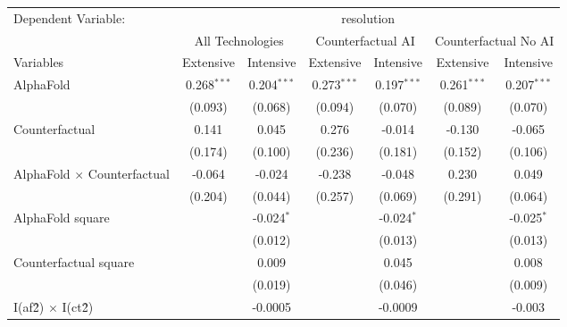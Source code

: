\begingroup
\centering
\begin{tabular}{lcccccc}
   \tabularnewline \midrule \midrule
   Dependent Variable: & \multicolumn{6}{c}{resolution}\\
 & \multicolumn{2}{c}{All Technologies} & \multicolumn{2}{c}{Counterfactual AI} & \multicolumn{2}{c}{Counterfactual No AI} \\
\cmidrule(lr){1-1}\cmidrule(lr){2-3} \cmidrule(lr){4-5} \cmidrule(lr){6-7}
Variables & \multicolumn{1}{c}{Extensive} & \multicolumn{1}{c}{Intensive} & \multicolumn{1}{c}{Extensive} & \multicolumn{1}{c}{Intensive} & \multicolumn{1}{c}{Extensive} & \multicolumn{1}{c}{Intensive} \\
\cmidrule(lr){1-1}\cmidrule(lr){2-2} \cmidrule(lr){3-3} \cmidrule(lr){4-4} \cmidrule(lr){5-5} \cmidrule(lr){6-6} \cmidrule(lr){7-7}
   AlphaFold                          & 0.268$^{***}$ & 0.204$^{***}$ & 0.273$^{***}$ & 0.197$^{***}$ & 0.261$^{***}$ & 0.207$^{***}$\\   
                                      & (0.093)       & (0.068)       & (0.094)       & (0.070)       & (0.089)       & (0.070)\\   
   Counterfactual                     & 0.141         & 0.045         & 0.276         & -0.014        & -0.130        & -0.065\\   
                                      & (0.174)       & (0.100)       & (0.236)       & (0.181)       & (0.152)       & (0.106)\\   
   AlphaFold $\times$ Counterfactual  & -0.064        & -0.024        & -0.238        & -0.048        & 0.230         & 0.049\\   
                                      & (0.204)       & (0.044)       & (0.257)       & (0.069)       & (0.291)       & (0.064)\\   
   AlphaFold square                   &               & -0.024$^{*}$  &               & -0.024$^{*}$  &               & -0.025$^{*}$\\   
                                      &               & (0.012)       &               & (0.013)       &               & (0.013)\\   
   Counterfactual square              &               & 0.009         &               & 0.045         &               & 0.008\\   
                                      &               & (0.019)       &               & (0.046)       &               & (0.009)\\   
   I(af\^2) $\times$ I(ct\^2)         &               & -0.0005       &               & -0.0009       &               & -0.003\\   

\end{tabular}
